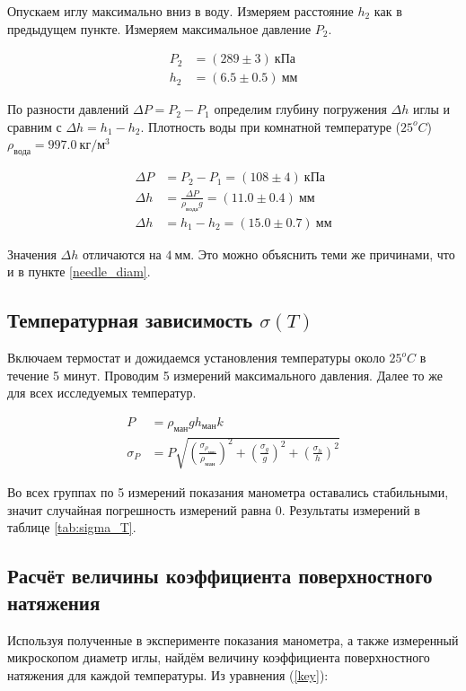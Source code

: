 \documentclass[a4paper, 12pt]{article}
\begin{document}
			Опускаем иглу максимально вниз в воду. Измеряем расстояние $h_2$ как в предыдущем пункте. Измеряем максимальное давление $P_2$.

			\begin{align*}
				P_2 &= (289 \pm 3)~кПа\\
				h_2 &= (6.5 \pm 0.5)~мм
			\end{align*}

			По разности давлений $\Delta P = P_2 - P_1$ определим глубину погружения $\Delta h$ иглы и сравним с $\Delta h = h_1 - h_2$. Плотность воды при комнатной температуре ($25^oC$) $\rho_{вода} = 997.0~кг/м^3$

			\begin{align*}
				\Delta P &= P_2 - P_1 = (108 \pm 4)~кПа\\
				\Delta h &= \frac{\Delta P}{\rho_{вода} g} = (11.0 \pm 0.4)~мм\\
				\Delta h &= h_1 - h_2 = (15.0 \pm 0.7)~мм
			\end{align*}

			Значения $\Delta h$ отличаются на $4~мм$. Это можно объяснить теми же причинами, что и в пункте \ref{needle_diam}.

		\subsection{Температурная зависимость $\sigma(T)$}

			Включаем термостат и дожидаемся установления температуры около $25^oC$ в течение 5 минут. Проводим 5 измерений максимального давления. Далее то же для всех исследуемых температур.

			\begin{align*}
				P &= \rho_{ман} g h_{ман} k \\
				\sigma_P &= P \sqrt{\left( \frac{\sigma_{\rho_{ман}}}{\rho_{ман}} \right)^2 + \left( \frac{\sigma_g}{g} \right)^2 + \left( \frac{\sigma_h}{h} \right)^2}
			\end{align*}

			Во всех группах по 5 измерений показания манометра оставались стабильными, значит случайная погрешность измерений равна 0. Результаты измерений в таблице \ref{tab:sigma_T}.

		\subsection{Расчёт величины коэффициента поверхностного натяжения}

			Используя полученные в эксперименте показания манометра, а также измеренный микроскопом диаметр иглы, найдём величину коэффициента поверхностного натяжения для каждой температуры. Из уравнения (\ref{key}):
\end{document}

